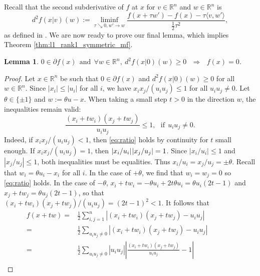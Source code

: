 \documentclass[12pt]{article}
\theoremstyle{definition}
\theoremstyle{plain}
\newtheorem{lemma}{Lemma}
\begin{document}
Recall that the second subderivative of $f$ at $x$ for $v\in \mathbb{R}^n$ and $w\in \mathbb{R}^n$ is
\begin{equation*}
    d^2 f(x|v)(w):= \liminf_{\tau \searrow 0,w'\rightarrow w} \frac{f(x+\tau w') - f(x) - \tau \langle v,w'\rangle}{\frac{1}{2}\tau^2},
\end{equation*}
as defined in \protect\cite[Definition 13.3]{rockafellar2009variational}. We are now ready to prove our final lemma, which implies Theorem \ref{thm:l1_rank1_symmetric_mf}.
\begin{lemma}
\label{lemma:spurious}
\normalfont
$0 \in \partial f(x) ~~ \text{and} ~~ \forall w \in \mathbb{R}^n, ~ d^2f(x|0)(w) \geqslant 0 ~~~ \Longrightarrow ~~~ f(x)=0$.
\end{lemma}
\begin{proof}
Let $x\in \mathbb{R}^n$ be such that $0 \in \partial f(x)$ and $d^2f(x|0)(w) \geqslant 0$ for all $w\in \mathbb{R}^n$. Since $|x_i| \leqslant |u_i|$ for all $i$, we have $x_ix_j/(u_iu_j) \leqslant 1$ for all $u_iu_j\neq 0$. Let $\theta \in \{\pm 1\}$ and $w := \theta u -x$. When taking a small step $t>0$ in the direction $w$, the inequalities remain valid:
\begin{equation}
\label{eq:ratio}
    \frac{(x_i+t w_i)(x_j+ t w_j)}{u_iu_j} \leqslant 1,~~~\text{if}~~u_iu_j \neq 0.
\end{equation}
Indeed, if $x_ix_j/(u_iu_j) < 1$, then \eqref{eq:ratio} holds by continuity for $t$ small enough. If $x_ix_j/(u_iu_j) = 1$, then $|x_i/u_i|\hspace*{.3mm}|x_j/u_j| = 1$. Since $|x_i/u_i| \leqslant 1$ and $|x_j/u_j| \leqslant 1$, both inequalities must be equalities. Thus $x_i/u_i = x_j/u_j = \pm \theta$. Recall that $w_i = \theta u_i - x_i$ for all $i$. In the case of $+\theta$, we find that $w_i = w_j = 0$ so \eqref{eq:ratio} holds. In the case of $-\theta$, $x_i + t w_i = -\theta u_i + 2t \theta u_i = \theta u_i(2t -1)$ and $x_j + t w_j = \theta u_j(2t -1)$, so that $(x_i + t w_i)(x_j + t w_j)/(u_iu_j) = (2t-1)^2 <1$. It follows that
\begin{subequations}
\label{eq:brutal}
	\begin{align}
	\label{last_brutal_a} f(x+tw) = & \frac{1}{2} \sum\limits_{i,j = 1}^n |(x_i+t w_i) (x_j+t w_j) - u_i u_j| ~~~~~~~~~~~~~~~~~~~\\
	\label{last_brutal_b} = & \frac{1}{2} \sum\limits_{u_iu_j \neq 0} |(x_i+t w_i) (x_j+t w_j) - u_i u_j|\\
	\label{last_brutal_c} = & \frac{1}{2} \sum\limits_{u_iu_j \neq 0} |u_i u_j|\left|\frac{(x_i+t w_i) (x_j+t w_j)}{u_iu_j} - 1\right|\\

\end{align}
\end{subequations}
\end{proof}
\end{document}

